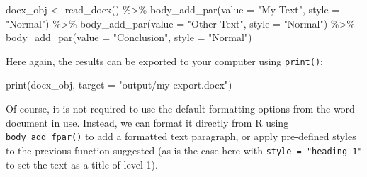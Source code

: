 \documentclass[
]{krantz}
\makeatletter
\newenvironment{Shaded}{\begin{snugshade}}{\end{snugshade}}
\newcommand{\AttributeTok}[1]{\textcolor[rgb]{0.61,0.61,0.61}{#1}}
\newcommand{\FunctionTok}[1]{\textcolor[rgb]{0,0,0}{#1}}
\newcommand{\NormalTok}[1]{#1}
\newcommand{\OtherTok}[1]{\textcolor[rgb]{0.37,0.37,0.37}{#1}}
\newcommand{\SpecialCharTok}[1]{\textcolor[rgb]{0,0,0}{#1}}
\newcommand{\StringTok}[1]{\textcolor[rgb]{0.5,0.5,0.5}{#1}}
\newenvironment{kframe}{%
\medskip{}
\setlength{\fboxsep}{.8em}
 \def\at@end@of@kframe{}%
 \ifinner\ifhmode%
  \def\at@end@of@kframe{\end{minipage}}%
  \begin{minipage}{\columnwidth}%
 \fi\fi%
 \def\FrameCommand##1{\hskip\@totalleftmargin \hskip-\fboxsep
 \colorbox{shadecolor}{##1}\hskip-\fboxsep
     \hskip-\linewidth \hskip-\@totalleftmargin \hskip\columnwidth}%
 \MakeFramed {\advance\hsize-\width
   \@totalleftmargin\z@ \linewidth\hsize
   \@setminipage}}%
 {\par\unskip\endMakeFramed%
 \at@end@of@kframe}
\renewenvironment{Shaded}{\begin{kframe}}{\end{kframe}}
\makeatother
\begin{document}
\begin{Shaded}
\begin{Highlighting}[]
\NormalTok{docx\_obj }\OtherTok{\textless{}{-}} \FunctionTok{read\_docx}\NormalTok{() }\SpecialCharTok{\%\textgreater{}\%} 
  \FunctionTok{body\_add\_par}\NormalTok{(}\AttributeTok{value =} \StringTok{"My Text"}\NormalTok{, }\AttributeTok{style =} \StringTok{"Normal"}\NormalTok{) }\SpecialCharTok{\%\textgreater{}\%}
  \FunctionTok{body\_add\_par}\NormalTok{(}\AttributeTok{value =} \StringTok{"Other Text"}\NormalTok{, }\AttributeTok{style =} \StringTok{"Normal"}\NormalTok{) }\SpecialCharTok{\%\textgreater{}\%} 
  \FunctionTok{body\_add\_par}\NormalTok{(}\AttributeTok{value =} \StringTok{"Conclusion"}\NormalTok{, }\AttributeTok{style =} \StringTok{"Normal"}\NormalTok{)}
\end{Highlighting}
\end{Shaded}

Here again, the results can be exported to your computer using \texttt{print()}:

\begin{Shaded}
\begin{Highlighting}[]
\FunctionTok{print}\NormalTok{(docx\_obj, }\AttributeTok{target =} \StringTok{"output/my export.docx"}\NormalTok{)}
\end{Highlighting}
\end{Shaded}

Of course, it is not required to use the default formatting options from the word document in use. Instead, we can format it directly from R using \texttt{body\_add\_fpar()} to add a formatted text paragraph, or apply pre-defined styles to the previous function suggested (as is the case here with \texttt{style\ =\ "heading\ 1"} to set the text as a title of level 1).
\end{document}

